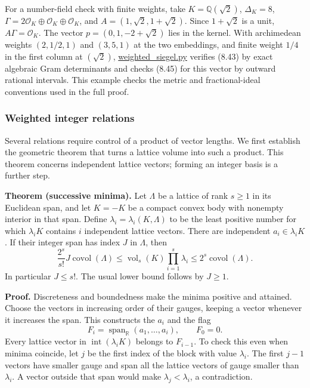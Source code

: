 \documentclass[
  11pt,
  a4paper,
]{article}
\begin{document}
For a number-field check with finite weights, take
\(K=\mathbb Q(\sqrt2)\), \(\Delta_K=8\),
\(\Gamma=2\mathcal O_K\oplus\mathcal O_K\oplus\mathcal O_K\), and
\(A=(1,\sqrt2,1+\sqrt2)\). Since \(1+\sqrt2\) is a unit,
\(A\Gamma=\mathcal O_K\). The vector \(p=(0,1,-2+\sqrt2)\) lies in the
kernel. With archimedean weights \((2,1/2,1)\) and \((3,5,1)\) at the
two embeddings, and finite weight \(1/4\) in the first column at
\((\sqrt2)\),
\href{https://kokunoyumeto.github.io/open-math-courses-public/courses/TR-BAKER/verification/weighted_siegel.py}{weighted\_siegel.py} verifies
(8.43) by exact algebraic Gram determinants and checks (8.45) for this
vector by outward rational intervals. This example checks the metric and
fractional-ideal conventions used in the full proof.

\subsubsection{Weighted integer
relations}\label{weighted-integer-relations}

Several relations require control of a product of vector lengths. We
first establish the geometric theorem that turns a lattice volume into
such a product. This theorem concerns independent lattice vectors;
forming an integer basis is a further step.

\textbf{Theorem (successive minima).} Let \(\Lambda\) be a lattice of
rank \(s\ge1\) in its Euclidean span, and let \(K=-K\) be a compact
convex body with nonempty interior in that span. Define
\(\lambda_i=\lambda_i(K,\Lambda)\) to be the least positive number for
which \(\lambda_iK\) contains \(i\) independent lattice vectors. There
are independent \(a_i\in\lambda_iK\). If their integer span has index
\(J\) in \(\Lambda\), then \[
\frac{2^s}{s!}J\operatorname{covol}(\Lambda)
\le \operatorname{vol}_s(K)\prod_{i=1}^s\lambda_i
\le 2^s\operatorname{covol}(\Lambda).
\tag{8.46}
\] In particular \(J\le s!\). The usual lower bound follows by
\(J\ge1\).

\textbf{Proof.} Discreteness and boundedness make the minima positive
and attained. Choose the vectors in increasing order of their gauges,
keeping a vector whenever it increases the span. This constructs the
\(a_i\) and the flag \[
F_i=\operatorname{span}_{\mathbb R}(a_1,\ldots,a_i),\qquad F_0=0.
\] Every lattice vector in \(\operatorname{int}(\lambda_iK)\) belongs to
\(F_{i-1}\). To check this even when minima coincide, let \(j\) be the
first index of the block with value \(\lambda_i\). The first \(j-1\)
vectors have smaller gauge and span all the lattice vectors of gauge
smaller than \(\lambda_i\). A vector outside that span would make
\(\lambda_j<\lambda_i\), a contradiction.
\end{document}

